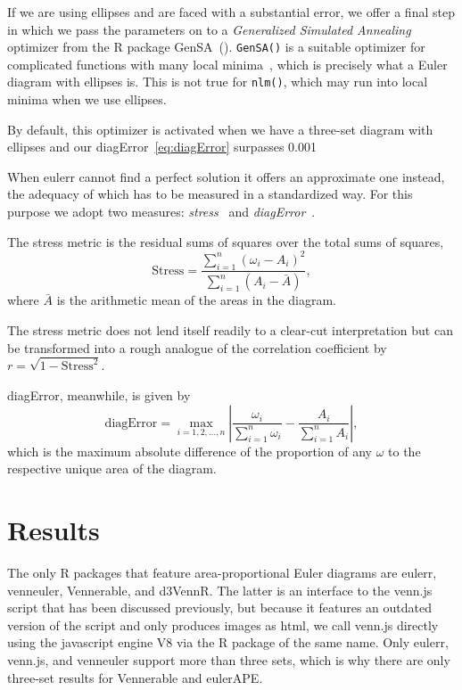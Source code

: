 \documentclass[
  oneside,
  openany,
  numbers=noendperiod,
  parskip=half,
  bibliography=totoc
]{scrbook}\usepackage[]{graphicx}\usepackage{xcolor}
\newcommand{\proglang}[1]{\textsf{#1}}
\newcommand{\pkg}[1]{{\fontseries{b}\selectfont #1}}
\newcommand{\code}[1]{\texttt{#1}}
\begin{document}
If we are using ellipses and are faced with a substantial
error, we offer a final step in which we
pass the parameters on to a \emph{Generalized Simulated Annealing} optimizer
from the R package \pkg{GenSA}~(\citep{xiang_2013}). \code{GenSA()} is a
suitable optimizer for complicated functions with many local
minima~\citep{mullen_2014}, which is precisely what a Euler diagram with
ellipses is. This is not true for \code{nlm()}, which may run into local
minima when we use ellipses.

By default, this optimizer is activated when we have a three-set diagram
with ellipses and our diagError~\eqref{eq:diagError} surpasses 0.001

When \pkg{eulerr} cannot find a perfect solution it offers an approximate one
instead, the adequacy of which has to be measured in a standardized way. For
this purpose we adopt two measures: \emph{stress}~\citep{wilkinson_2012} and
\emph{diagError}~\citep{micallef_2014a}.

The stress metric is the residual sums of squares over the total sums of
squares,
\begin{equation}
\text{Stress} = \frac{\sum_{i=1}^n (\omega_i - A_i)^2}{\sum_{i=1}^n
  (A_i - \bar{A})},
\label{eq:stress}
\end{equation}
where $\bar{A}$ is the arithmetic mean of the areas in the diagram.

The stress metric does not lend itself readily to a clear-cut interpretation but
can be transformed into a rough analogue of the correlation coefficient by
$r = \sqrt{1-\text{Stress}^2}$.

diagError, meanwhile, is given by
\begin{equation}
\text{diagError} = \max_{i = 1, 2, \dots, n} \left|
  \frac{\omega_i}{\sum_{i=1}^n \omega_i} -\frac{A_i}{\sum_{i=1}^n A_i} \right|,
\label{eq:diagError}
\end{equation}
which is the maximum absolute difference of the proportion of any $\omega$ to
the respective unique area of the diagram.

\chapter{Results}
\label{ch:results}

The only R packages that feature area-proportional Euler diagrams are
\pkg{eulerr}, \pkg{venneuler}, \pkg{Vennerable}, and \pkg{d3VennR}. The latter
is an interface to the \pkg{venn.js} script that has been discussed previously,
but because it features an outdated version of the script and only produces
images as html, we call \pkg{venn.js} directly using the \proglang{javascript}
engine \pkg{V8} via the R package of the same name.
Only \pkg{eulerr}, \pkg{venn.js}, and \pkg{venneuler} support more than three
sets, which is why there are only three-set results for \pkg{Vennerable} and
\pkg{eulerAPE}.
\end{document}
